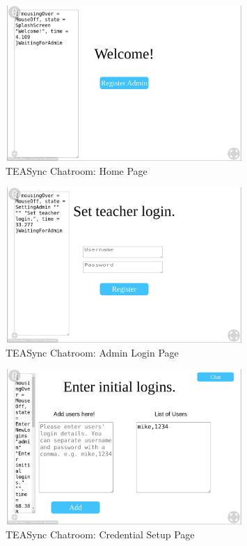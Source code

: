 \begin{figure}[H]
    \centering
    \includegraphics[width=0.8\textwidth]{diagrams/TEASyncChatroomHome.png}
    \caption{TEASync Chatroom: Home Page}
    \label{fig:enter-label}
\end{figure}

\begin{figure}[H]
    \centering
    \includegraphics[width=0.8\textwidth]{diagrams/TEASyncChatroomAdminLogin.png}
    \caption{TEASync Chatroom: Admin Login Page}
    \label{fig:enter-label}
\end{figure}

\begin{figure}[H]
    \centering
    \includegraphics[width=0.8\textwidth]{diagrams/TEASyncChatroomCredsSetup.png}
    \caption{TEASync Chatroom: Credential Setup Page}
    \label{fig:enter-label}
\end{figure}


